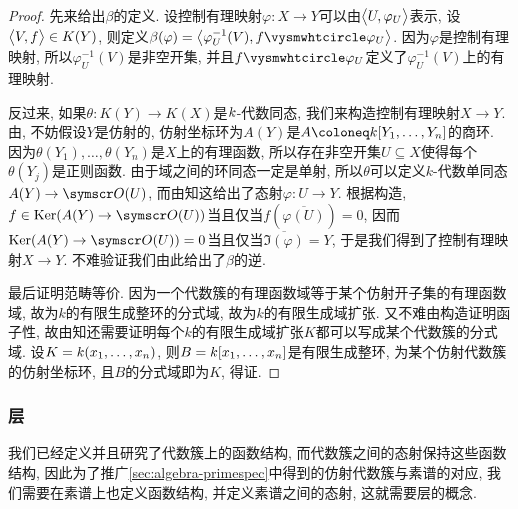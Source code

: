 \begin{proof}
  先来给出$\beta$的定义. 设控制有理映射$\varphi\colon X\to Y$可以由$\lrbig<>{U, \varphi_U}$表示, 设$\lrbig<>{V, f}\in K(Y)$, 则定义$\beta(\varphi)=\lrbig<>{\varphi_{U}^{-1}(V), f\composite \varphi_U}$. 因为$\varphi$是控制有理映射, 所以$\varphi_{U}^{-1}(V)$是非空开集, 并且$f\composite \varphi_U$定义了$\varphi_{U}^{-1}(V)$上的有理映射.

  反过来, 如果$\theta\colon K(Y)\to K(X)$是$\kk$-代数同态, 我们来构造控制有理映射$X\to Y$. 由, 不妨假设$Y$是仿射的, 仿射坐标环为$A(Y)$是$A\coloneq \kk [Y_1, \dotsc, Y_n]$的商环. 因为$\theta(Y_1), \dotsc, \theta(Y_n)$是$X$上的有理函数, 所以存在非空开集$U\subseteq X$使得每个$\theta(Y_j)$是正则函数. 由于域之间的环同态一定是单射, 所以$\theta$可以定义$k$-代数单同态$A(Y)\to \OO (U)$, 而由知这给出了态射$\varphi\colon U\to Y$. 根据构造, $f\in\Ker (A(Y)\to \OO (U))$当且仅当$f(\overline{\varphi (U)})=0$, 因而$\Ker (A(Y)\to \OO (U))=0$当且仅当$\overline{\Im (\varphi)}=Y$, 于是我们得到了控制有理映射$X\to Y$. 不难验证我们由此给出了$\beta$的逆.

  最后证明范畴等价. 因为一个代数簇的有理函数域等于某个仿射开子集的有理函数域, 故为$k$的有限生成整环的分式域, 故为$k$的有限生成域扩张. 又不难由构造证明函子性, 故由知还需要证明每个$k$的有限生成域扩张$K$都可以写成某个代数簇的分式域. 设$K=\kk (x_1, \dotsc, x_n)$, 则$B=\kk [x_1, \dotsc, x_n]$是有限生成整环, 为某个仿射代数簇的仿射坐标环, 且$B$的分式域即为$K$, 得证.
\end{proof}



\subsubsection{层}

我们已经定义并且研究了代数簇上的函数结构, 而代数簇之间的态射保持这些函数结构, 因此为了推广\ref{sec:algebra-primespec}中得到的仿射代数簇与素谱的对应, 我们需要在素谱上也定义函数结构, 并定义素谱之间的态射, 这就需要层的概念.

